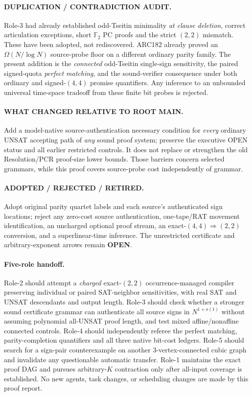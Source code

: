 \documentclass[11pt]{article}
\begin{document}
\paragraph{DUPLICATION / CONTRADICTION AUDIT.} Role-3 had already established odd-Tseitin minimality \emph{at clause deletion}, correct articulation exceptions, short $\mathbb F_2$ PC proofs and the strict $(2,2)$ mismatch. These have been adopted, not rediscovered. ARC182 already proved an $\Omega(N/\log N)$ source-probe floor on a different ordinary parity family. The present addition is the \emph{connected} odd-Tseitin single-sign sensitivity, the paired signed-quota \emph{perfect matching}, and the sound-verifier consequence under both ordinary and signed-$(4,4)$ promise quantifiers. Any inference to an unbounded universal time-space tradeoff from these finite bit probes is rejected.

\paragraph{WHAT CHANGED RELATIVE TO ROOT MAIN.} Add a model-native source-authentication necessary condition for \emph{every} ordinary UNSAT accepting path of \emph{any} sound proof system; preserve the executive OPEN status and all earlier restricted controls. It does not replace or strengthen the old Resolution/PCR proof-size lower bounds. Those barriers concern selected grammars, while this proof covers source-probe cost independently of grammar.

\paragraph{ADOPTED / REJECTED / RETIRED.} Adopt original parity quartet labels and each source's authenticated sign locations; reject any zero-cost source authentication, one-tape/RAT movement identification, an uncharged optional proof stream, an exact-$(4,4)\Rightarrow(2,2)$ conversion, and a superlinear-time inference. The unrestricted certificate and arbitrary-exponent arrows remain \textbf{OPEN}.

\paragraph{Five-role handoff.} Role-2 should attempt a \emph{charged} exact-$(2,2)$ occurrence-managed compiler preserving individual or paired SAT-neighbor sensitivities, with real SAT and UNSAT descendants and output length. Role-3 should check whether a stronger sound certificate grammar can authenticate all source signs in $N^{1+o(1)}$ without assuming polynomial all-UNSAT proof length, and test mixed affine/nonaffine connected controls. Role-4 should independently referee the perfect matching, parity-completion quantifiers and all three native bit-cost ledgers. Role-5 should search for a sign-pair counterexample on another 3-vertex-connected cubic graph and invalidate any questionable automatic transfer. Role-1 maintains the exact proof DAG and pursues arbitrary-$K$ contraction only after all-input coverage is established. No new agents, task changes, or scheduling changes are made by this proof report.
\end{document}
